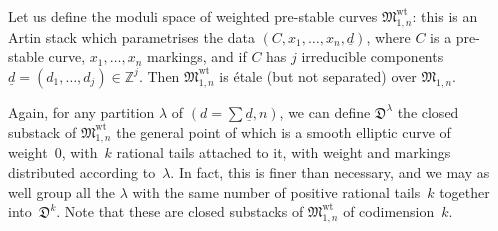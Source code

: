 \documentclass[pdftex]{sigma}
\numberwithin{equation}{section}
\theoremstyle{plain}
\theoremstyle{definition}
\theoremstyle{remark}
\begin{document}
\begin{construction}\label{lboundary}Let us define the moduli space of weighted pre-stable curves $\mathfrak M_{1,n}^\text{wt}$: this is an Artin stack which parametrises the data $(C,x_1,\dots,x_n, \underline{d})$, where $C$ is a pre-stable curve, $x_1,\dots,x_n$ markings, and if $C$ has $j$ irreducible components $\underline{d}=(d_1,\dots,d_j)\in\mathbb{Z}^j$. Then $\mathfrak M_{1,n}^\text{wt}$ is \'{e}tale (but not separated) over $\mathfrak M_{1,n}$.

Again, for any partition $\lambda$ of $(d=\sum\underline{d},n)$, we can define $\mathfrak D^\lambda$ the closed substack of $\mathfrak M_{1,n}^\text{wt}$ the general point of which is a smooth elliptic curve of weight~0, with~$k$ rational tails attached to it, with weight and markings distributed according to~$\lambda$. In fact, this is finer than necessary, and we may as well group all the $\lambda$ with the same number of positive rational tails~$k$ together into~$\mathfrak D^k$. Note that these are closed substacks of $\mathfrak M_{1,n}^\text{wt}$ of codimension~$k$.
\end{construction}
\end{document}
